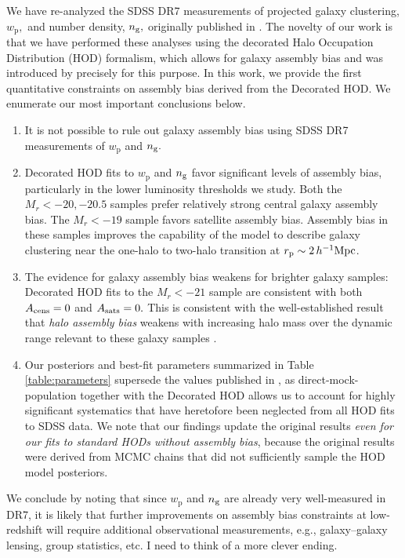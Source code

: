 \documentclass[usenatbib,usegraphicx,letterpaper]{mn2e}
\newcommand{\wprp}{w_{\mathrm{p}}}
\newcommand{\magr}{M_r}
\newcommand{\ben}{\begin{enumerate}}
\newcommand{\een}{\end{enumerate}}
\begin{document}
We have re-analyzed the SDSS DR7 measurements of projected galaxy clustering,
$\wprp,$ and number density, $n_{\rm g},$ originally published in \citet{zehavi_etal11}.
The novelty of our work is that we have performed these analyses using the
decorated Halo Occupation Distribution (HOD) formalism, which allows for galaxy
assembly bias and was introduced by \citet{hearin_etal16} precisely for this purpose.
In this work, we provide the first quantitative constraints on
assembly bias derived from the Decorated HOD. We enumerate our most important conclusions below.
%
\ben
%
\item It is not possible to rule out galaxy assembly bias using SDSS DR7 measurements of $\wprp$ and $n_{\rm g}.$
%
\item Decorated HOD fits to $\wprp$ and $n_{\rm g}$ favor significant levels of assembly bias, particularly in the lower luminosity thresholds we study. Both the $\magr<-20, -20.5$ samples prefer relatively strong central galaxy assembly bias. The $\magr<-19$ sample favors satellite assembly bias. Assembly bias in these samples improves the capability of the model to describe galaxy clustering near
the one-halo to two-halo transition at $r_{\rm p} \sim 2 \, h^{-1}\mathrm{Mpc}$.
%
\item The evidence for galaxy assembly bias weakens for brighter galaxy samples: Decorated HOD fits to the $\magr<-21$ sample are consistent with both $A_{\rm cens}=0$ and $A_{\rm sats}=0.$ This is consistent with the well-established result that
{\em halo assembly bias} weakens with increasing halo mass over the dynamic range relevant to these galaxy samples
\citep[see, e.g., Figure 8 of][and references therein]{hearin_etal16}.
%
\item Our posteriors and best-fit parameters summarized in
Table \ref{table:parameters} supersede the values published in \citet{zehavi_etal11},
as direct-mock-population together with the Decorated HOD allows us to account for
highly significant systematics that have heretofore been neglected from all HOD fits to SDSS data.
We note that our findings update the original \citet{zehavi_etal11} results
{\em even for our fits to standard HODs without assembly bias}, because
the original results were derived from MCMC chains that did not sufficiently sample the HOD model posteriors.
%
\een
%
We conclude by noting that since $\wprp$ and $n_{\rm g}$ are already very well-measured in DR7,
it is likely that further improvements on assembly bias constraints at low-redshift will require additional
observational measurements, e.g., galaxy--galaxy lensing, group statistics, etc.
I need to think of a more clever ending.
\end{document}
